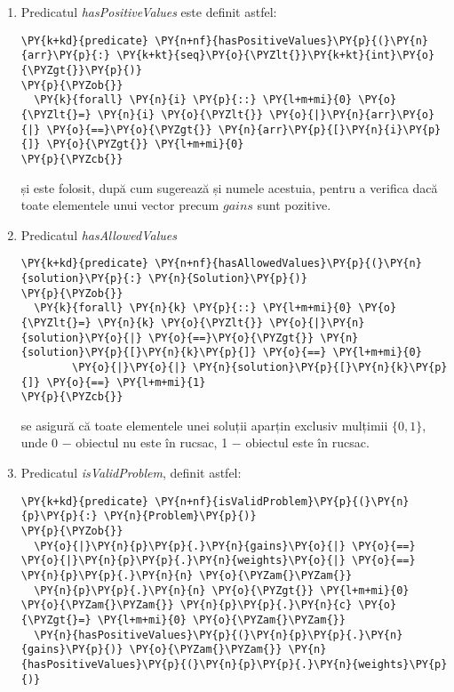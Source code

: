 \begin{enumerate}
    \item Predicatul \textit{hasPositiveValues} este definit astfel:
    \begin{Verbatim}[commandchars=\\\{\}]
\PY{k+kd}{predicate} \PY{n+nf}{hasPositiveValues}\PY{p}{(}\PY{n}{arr}\PY{p}{:} \PY{k+kt}{seq}\PY{o}{\PYZlt{}}\PY{k+kt}{int}\PY{o}{\PYZgt{}}\PY{p}{)}
\PY{p}{\PYZob{}}
  \PY{k}{forall} \PY{n}{i} \PY{p}{::} \PY{l+m+mi}{0} \PY{o}{\PYZlt{}=} \PY{n}{i} \PY{o}{\PYZlt{}} \PY{o}{|}\PY{n}{arr}\PY{o}{|} \PY{o}{==}\PY{o}{\PYZgt{}} \PY{n}{arr}\PY{p}{[}\PY{n}{i}\PY{p}{]} \PY{o}{\PYZgt{}} \PY{l+m+mi}{0}
\PY{p}{\PYZcb{}}
\end{Verbatim}
    și este folosit, după cum sugerează și numele acestuia, pentru a verifica dacă toate elementele unui vector precum $gains$ sunt pozitive.
    \item Predicatul \textit{hasAllowedValues}
    \begin{Verbatim}[commandchars=\\\{\}]
\PY{k+kd}{predicate} \PY{n+nf}{hasAllowedValues}\PY{p}{(}\PY{n}{solution}\PY{p}{:} \PY{n}{Solution}\PY{p}{)}
\PY{p}{\PYZob{}}
  \PY{k}{forall} \PY{n}{k} \PY{p}{::} \PY{l+m+mi}{0} \PY{o}{\PYZlt{}=} \PY{n}{k} \PY{o}{\PYZlt{}} \PY{o}{|}\PY{n}{solution}\PY{o}{|} \PY{o}{==}\PY{o}{\PYZgt{}} \PY{n}{solution}\PY{p}{[}\PY{n}{k}\PY{p}{]} \PY{o}{==} \PY{l+m+mi}{0} 
        \PY{o}{|}\PY{o}{|} \PY{n}{solution}\PY{p}{[}\PY{n}{k}\PY{p}{]} \PY{o}{==} \PY{l+m+mi}{1}
\PY{p}{\PYZcb{}}
\end{Verbatim}
    se asigură că toate elementele unei soluții aparțin exclusiv mulțimii $\{0, 1\}$, unde 0 \(-\) obiectul nu este în rucsac, 1 \(-\) obiectul este în rucsac.
    \item Predicatul \textit{isValidProblem}, definit astfel:
    \begin{Verbatim}[commandchars=\\\{\}]
\PY{k+kd}{predicate} \PY{n+nf}{isValidProblem}\PY{p}{(}\PY{n}{p}\PY{p}{:} \PY{n}{Problem}\PY{p}{)}
\PY{p}{\PYZob{}}
  \PY{o}{|}\PY{n}{p}\PY{p}{.}\PY{n}{gains}\PY{o}{|} \PY{o}{==} \PY{o}{|}\PY{n}{p}\PY{p}{.}\PY{n}{weights}\PY{o}{|} \PY{o}{==} \PY{n}{p}\PY{p}{.}\PY{n}{n} \PY{o}{\PYZam{}\PYZam{}} 
  \PY{n}{p}\PY{p}{.}\PY{n}{n} \PY{o}{\PYZgt{}} \PY{l+m+mi}{0} \PY{o}{\PYZam{}\PYZam{}} \PY{n}{p}\PY{p}{.}\PY{n}{c} \PY{o}{\PYZgt{}=} \PY{l+m+mi}{0} \PY{o}{\PYZam{}\PYZam{}} 
  \PY{n}{hasPositiveValues}\PY{p}{(}\PY{n}{p}\PY{p}{.}\PY{n}{gains}\PY{p}{)} \PY{o}{\PYZam{}\PYZam{}} \PY{n}{hasPositiveValues}\PY{p}{(}\PY{n}{p}\PY{p}{.}\PY{n}{weights}\PY{p}{)} 

\end{Verbatim}
\end{enumerate}
